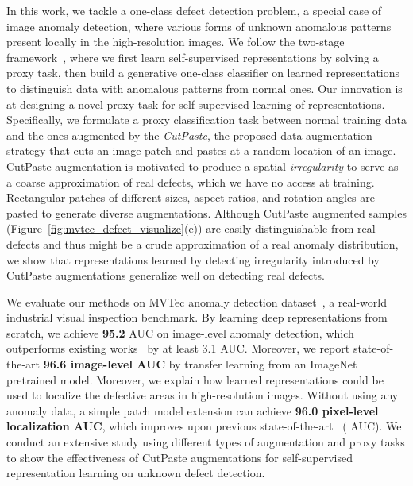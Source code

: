 \documentclass[final]{cvpr}
\begin{document}
In this work, we tackle a one-class defect detection problem, a special case of image anomaly detection, where various forms of unknown anomalous patterns present locally in the high-resolution images.
We follow the two-stage framework~\cite{sohn2020learning}, where we first learn self-supervised representations by solving a proxy task, then build a generative one-class classifier on learned representations to distinguish data with anomalous patterns from normal ones. Our innovation is at designing a novel proxy task for self-supervised learning of representations. Specifically, we formulate a proxy classification task between normal training data and the ones augmented by the \emph{CutPaste}, the proposed data augmentation strategy that cuts an image patch and pastes at a random location of an image. CutPaste augmentation is motivated to produce a spatial \emph{irregularity} to serve as a coarse approximation of real defects, which we have no access at training. 
Rectangular patches of different sizes, aspect ratios, and rotation angles are pasted to generate diverse augmentations. Although CutPaste augmented samples (Figure~\ref{fig:mvtec_defect_visualize}(e)) are easily distinguishable from real defects and thus might be a crude approximation of a real anomaly distribution, we show that representations learned by detecting irregularity introduced by CutPaste augmentations generalize well on detecting real defects. 

We evaluate our methods on MVTec anomaly detection dataset~\cite{bergmann2019mvtec}, a real-world industrial visual inspection benchmark. By learning deep representations from scratch, we achieve \textbf{95.2} AUC on image-level anomaly detection, which outperforms existing works~\cite{huang2019inverse,yi2020patch} by at least 3.1 AUC. Moreover, we report state-of-the-art \textbf{96.6 image-level AUC} by transfer learning from an ImageNet pretrained model. 
Moreover, we explain how learned representations could be used to localize the defective areas in high-resolution images. Without using any anomaly data, a simple patch model  extension can achieve \textbf{96.0 pixel-level localization AUC}, which improves upon previous state-of-the-art~\cite{yi2020patch} ( AUC). 
We conduct an extensive study using different types of augmentation and proxy tasks to show the effectiveness of CutPaste augmentations for self-supervised representation learning on unknown defect detection. 
\end{document}
